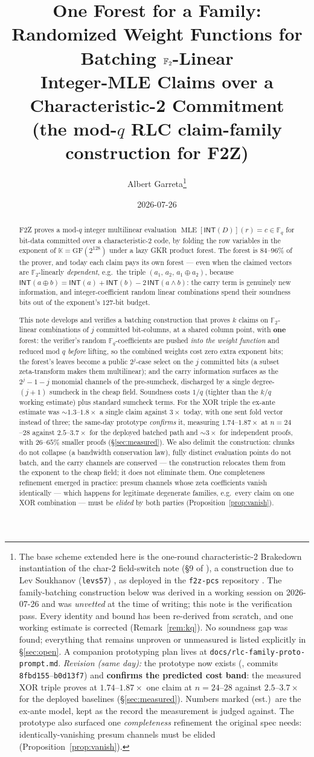 \documentclass[11pt]{article}
\title{\bf One Forest for a Family:\\
Randomized Weight Functions for Batching $\Ftwo$-Linear\\
Integer-MLE Claims over a Characteristic-2 Commitment\\[4pt]
\large (the mod-$q$ RLC claim-family construction for F2Z)}
\author{Albert Garreta\thanks{The base scheme extended here is the
one-round characteristic-2 Brakedown instantiation of the char-2
field-switch note (\S9 of \cite{Xnote}), a construction due to Lev
Soukhanov (\texttt{levs57}) \cite{Sou}, as deployed in the
\texttt{f2z-pcs} repository \cite{F2Zdesign,F2Zreadme}. The family-batching
construction below was derived in a working session on 2026-07-26 and was
\emph{unvetted} at the time of writing; this note is the verification pass.
Every identity and bound has been re-derived from scratch, and one working
estimate is corrected (Remark~\ref{rem:kq}). No soundness gap was found;
everything that remains unproven or unmeasured is listed explicitly in
\S\ref{sec:open}. A companion prototyping plan lives at
\texttt{docs/rlc-family-proto-prompt.md}. \emph{Revision (same day):} the
prototype now exists
(\code{prove/verify\_mle\_eval\_mod\_q\_ligerito\_rlc\_family}, commits
\texttt{8fbd155}--\texttt{b0d13f7}) and \textbf{confirms the predicted cost
band}: the measured XOR triple proves at $1.74$--$1.87\times$ one claim at
$n=24$--$28$ against $2.5$--$3.7\times$ for the deployed baselines
(\S\ref{sec:measured}). Numbers marked (est.)\ are the ex-ante model, kept
as the record the measurement is judged against. The prototype also
surfaced one \emph{completeness} refinement the original spec needs:
identically-vanishing presum channels must be elided
(Proposition~\ref{prop:vanish}).}}
\date{2026-07-26}
\newcommand{\F}{\mathbb{F}}
\newcommand{\K}{\mathbb{K}}            %
\newcommand{\Ftwo}{\F_2}
\newcommand{\Fq}{\F_q}                 %
\newcommand{\INT}{\mathsf{INT}}
\DeclareMathOperator{\MLE}{MLE}
\theoremstyle{plain}
\theoremstyle{definition}
\theoremstyle{remark}
\begin{document}
\maketitle

\begin{abstract}
F2Z proves a mod-$q$ integer multilinear evaluation
$\MLE[\INT(D)](r)=c\in\Fq$ for bit-data committed over a characteristic-2
code, by folding the row variables in the exponent of $\K=\mathrm{GF}(2^{128})$
under a lazy GKR product forest. The forest is $84$--$96\%$ of the prover, and
today each claim pays its own forest --- even when the claimed vectors are
$\Ftwo$-linearly \emph{dependent}, e.g.\ the triple $(a_1,\,a_2,\,a_1\oplus a_2)$,
because $\INT(a\oplus b)=\INT(a)+\INT(b)-2\,\INT(a\wedge b)$: the carry term is
genuinely new information, and integer-coefficient random linear combinations
spend their soundness bits out of the exponent's $127$-bit budget.

This note develops and verifies a batching construction that proves $k$ claims
on $\Ftwo$-linear combinations of $j$ committed bit-columns, at a shared column
point, with \textbf{one} forest: the verifier's random $\Fq$-coefficients are
pushed \emph{into the weight function} and reduced mod $q$ \emph{before}
lifting, so the combined weights cost zero extra exponent bits; the forest's
leaves become a public $2^{j}$-case select on the $j$ committed bits (a subset
zeta-transform makes them multilinear); and the carry information surfaces as
the $2^{j}{-}1{-}j$ monomial channels of the pre-sumcheck, discharged by a
single degree-$(j{+}1)$ sumcheck in the cheap field. Soundness costs $1/q$
(tighter than the $k/q$ working estimate) plus standard sumcheck terms. For
the XOR triple the ex-ante estimate was ${\sim}1.3$--$1.8\times$ a single
claim against $3\times$ today, with one sent fold vector instead of three;
the same-day prototype \emph{confirms} it, measuring
$1.74$--$1.87\times$ at $n=24$--$28$ against $2.5$--$3.7\times$ for the
deployed batched path and ${\sim}3\times$ for independent proofs, with
$26$--$65\%$ smaller proofs (\S\ref{sec:measured}). We also
delimit the construction: chunks do not collapse (a bandwidth conservation
law), fully distinct evaluation points do not batch, and the carry channels are
conserved --- the construction relocates them from the exponent to the cheap
field; it does not eliminate them. One completeness refinement emerged in
practice: presum channels whose zeta coefficients vanish identically ---
which happens for legitimate degenerate families, e.g.\ every claim on one
XOR combination --- must be \emph{elided} by both parties
(Proposition~\ref{prop:vanish}).
\end{abstract}
\end{document}
